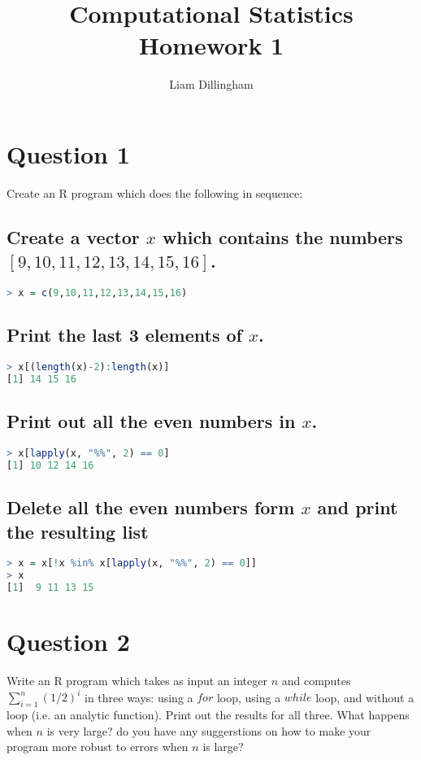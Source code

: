\documentclass[20pt]{article} %
\title{Computational Statistics Homework 1}
\author{Liam Dillingham}
\begin{document}
\maketitle

\section{Question 1} 
Create an R program which does the following in sequence: \\

\subsection{Create a vector $x$ which contains the numbers $[9,10,11,12,13,14,15,16]$.}
\begin{lstlisting}[language=R]
> x = c(9,10,11,12,13,14,15,16)
\end{lstlisting}

\subsection{Print the last 3 elements of $x$.}
\begin{lstlisting}[language=R]
> x[(length(x)-2):length(x)]
[1] 14 15 16
\end{lstlisting}

\subsection{Print out all the even numbers in $x$.}
\begin{lstlisting}[language=R]
> x[lapply(x, "%%", 2) == 0]
[1] 10 12 14 16
\end{lstlisting}

\subsection{Delete all the even numbers form $x$ and print the resulting list}
\begin{lstlisting}[language=R]
> x = x[!x %in% x[lapply(x, "%%", 2) == 0]]
> x
[1]  9 11 13 15
\end{lstlisting}

\newpage
\section{Question 2}
Write an R program which takes as input an integer $n$ and computes $\sum_{i=1}^{n} (1/2)^{i}$ in three ways: using a $for$ loop, using a $while$ loop, and without a loop (i.e. an analytic function). Print out the results for all three.  What happens when $n$ is very large? do you have any suggerstions on how to make your program more robust to errors when $n$ is large? \\
\end{document}
